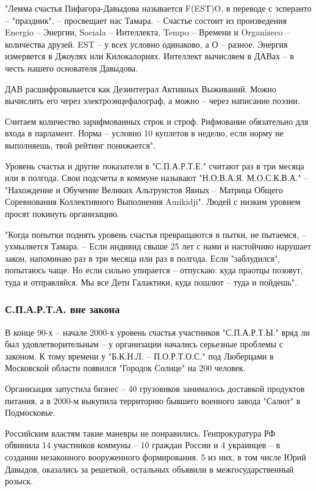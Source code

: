 "Лемма счастья Пифагора-Давыдова называется F(EST)O, в переводе с эсперанто  –
"праздник", – просвещает нас Тамара. – Счастье состоит из произведения Energio
– Энергии, Sociala – Интеллекта, Tempo – Времени и Organizeco – количества
друзей. EST – у всех условно одинаково, а О – разное. Энергия измеряется в
Джоулях или Килокалориях. Интеллект вычисляем в ДАВах – в честь нашего
основателя Давыдова. 

ДАВ расшифровывается как Дезинтеграл Активных Выживаний. Можно вычислить его
через электроэнцефалограф, а можно – через написание поэзии. 

Считаем количество зарифмованных строк и строф. Рифмование обязательно для
входа в парламент. Норма – условно 10 куплетов в неделю, если норму не
выполняешь, твой рейтинг понижается".

Уровень счастья и другие показатели в "С.П.А.Р.Т.Е." считают раз в три месяца
или в полгода. Свои подсчеты в коммуне называют "Н.О.В.А.Я. М.О.С.К.В.А." –
"Нахождение и Обучение Великих Альтруистов Явных – Матрица Общего Соревнования
Коллективного Выполнения Amikidji". Людей с низким уровнем просят покинуть
организацию.

"Когда попытки поднять уровень счастья превращаются в пытки, не пытаемся, –
ухмыляется Тамара. – Если индивид свыше 25 лет с нами и настойчиво нарушает
закон, напоминаю раз в три месяца или раз в полгода. Если "заблудился",
попытаюсь чаще. Но если сильно упирается – отпускаю: куда праотцы позовут, туда
и отправляйся. Мы все Дети Галактики, куда пошлют – туда и пойдешь".

\subsubsection{С.П.А.Р.Т.А. вне закона}

В конце 90-х – начале 2000-х уровень счастья участников "С.П.А.Р.Т.Ы." вряд ли
был удовлетворительным – у организации начались серьезные проблемы с законом. К
тому времени у "Б.К.Н.Л. – П.О.Р.Т.О.С." под Люберцами в Московской области
появился "Городок Солнце" на 200 человек. 

Организация запустила бизнес – 40 грузовиков занималось доставкой продуктов
питания, а в 2000-м выкупила территорию бывшего военного завода "Салют" в
Подмосковье.

Российским властям такие маневры не понравились. Генпрокуратура РФ обвинила 14
участников коммуны – 10 граждан России и 4 украинцев – в создании незаконного
вооруженного формирования. 5 из них, в том числе Юрий Давыдов, оказались за
решеткой, остальных объявили в межгосударственный розыск.

